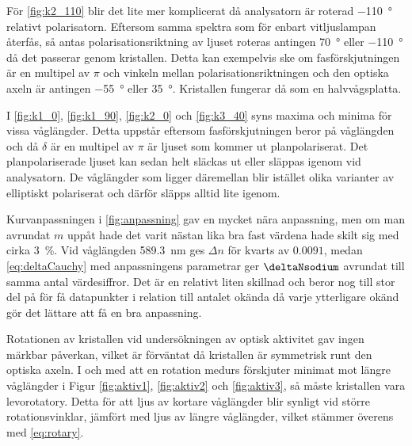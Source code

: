 \documentclass[a4paper]{article}
\begin{document}
För \autoref{fig:k2_110} blir det lite mer komplicerat då analysatorn är roterad \SI{-110}{\degree} relativt polarisatorn. Eftersom samma spektra som för enbart vitljuslampan återfås, så antas polarisationsriktning av ljuset roteras antingen \SI{+70}{\degree} eller \SI{-110}{\degree} då det passerar genom kristallen. Detta kan exempelvis ske om fasförskjutningen är en multipel av $\pi$ och vinkeln mellan polarisationsriktningen och den optiska axeln är antingen \SI{-55}{\degree} eller \SI{35}{\degree}. Kristallen fungerar då som en halvvågsplatta.


I \autoref{fig:k1_0}, \autoref{fig:k1_90}, \autoref{fig:k2_0} och \autoref{fig:k3_40} syns maxima och minima för vissa våglängder. Detta uppstår eftersom fasförskjutningen beror på våglängden och då $\delta$ är en multipel av $\pi$ är ljuset som kommer ut planpolariserat. Det planpolariserade ljuset kan sedan helt släckas ut eller släppas igenom vid analysatorn. De våglängder som ligger däremellan blir istället olika varianter av elliptiskt polariserat och därför släpps alltid lite igenom.



Kurvanpassningen i \autoref{fig:anpassning} gav en mycket nära anpassning, men om man avrundat $m$ uppåt hade det varit nästan lika bra fast värdena hade skilt sig med cirka \SI{3}{\percent}. Vid våglängden \SI{589.3}{\nano\meter} ges $\Delta n$ för kvarts av $0.0091$\cite[p.~383]{pearsonIntroOpt}, medan \eqref{eq:deltaCauchy} med anpassningens parametrar ger $\deltaNsodium$ avrundat till samma antal värdesiffror. Det är en relativt liten skillnad och beror nog till stor del på för få datapunkter i relation till antalet okända då varje ytterligare okänd gör det lättare att få en bra anpassning.


Rotationen av kristallen vid undersökningen av optisk aktivitet gav ingen märkbar påverkan, vilket är förväntat då kristallen är symmetrisk runt den optiska axeln. I och med att en rotation medurs förskjuter minimat mot längre våglängder i Figur \ref{fig:aktiv1}, \ref{fig:aktiv2} och \ref{fig:aktiv3}, så måste kristallen vara levorotatory. Detta för att ljus av kortare våglängder blir synligt vid större rotationsvinklar, jämfört med ljus av längre våglängder, vilket stämmer överens med \eqref{eq:rotary}.
\end{document}
